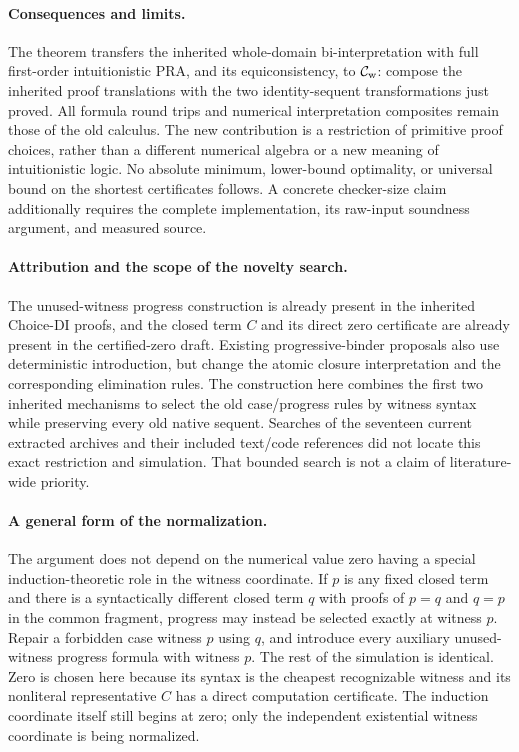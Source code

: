\documentclass[11pt,letterpaper]{article}
\theoremstyle{definition}\newtheorem{definition}[theorem]{Definition}
\theoremstyle{remark}\newtheorem{remark}[theorem]{Remark}
\begin{document}
\paragraph{Consequences and limits.}
The theorem transfers the inherited whole-domain bi-interpretation
with full first-order intuitionistic PRA, and its equiconsistency, to
$\mathcal C_{\rm w}$: compose the inherited proof translations with
the two identity-sequent transformations just proved.  All formula
round trips and numerical interpretation composites remain those of
the old calculus.  The new contribution is a restriction of primitive
proof choices, rather than a different numerical algebra or a new
meaning of intuitionistic logic.  No absolute minimum, lower-bound
optimality, or universal bound on the shortest certificates follows.
A concrete checker-size claim additionally requires the complete
implementation, its raw-input soundness argument, and measured source.

\paragraph{Attribution and the scope of the novelty search.}
The unused-witness progress construction is already present in the
inherited Choice-DI proofs, and the closed term $C$ and its direct zero
certificate are already present in the certified-zero draft.  Existing
progressive-binder proposals also use deterministic introduction, but
change the atomic closure interpretation and the corresponding
elimination rules.  The construction here combines the first two
inherited mechanisms to select the old case/progress rules by witness
syntax while preserving every old native sequent.  Searches of the
seventeen current extracted archives and their included text/code
references did not locate this exact restriction and simulation.
That bounded search is not a claim of literature-wide priority.

\paragraph{A general form of the normalization.}
The argument does not depend on the numerical value zero having a special
induction-theoretic role in the witness coordinate.  If $p$ is any fixed
closed term and there is a syntactically different closed term $q$ with
proofs of $p=q$ and $q=p$ in the common fragment, progress may instead be
selected exactly at witness $p$.  Repair a forbidden case witness $p$
using $q$, and introduce every auxiliary unused-witness progress formula
with witness $p$.  The rest of the simulation is identical.  Zero is
chosen here because its syntax is the cheapest recognizable witness and
its nonliteral representative $C$ has a direct computation certificate.
The induction coordinate itself still begins at zero; only the independent
existential witness coordinate is being normalized.
\end{document}
